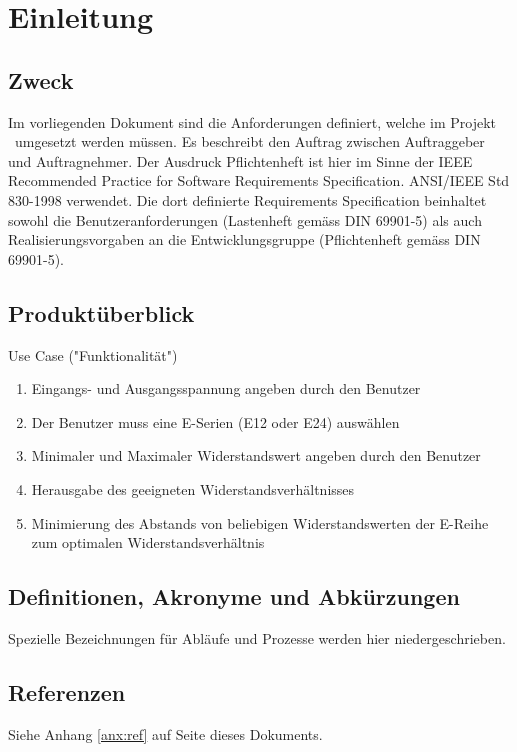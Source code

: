 \section{Einleitung}
\label{sec:intro}

\subsection{Zweck}
Im vorliegenden Dokument sind die Anforderungen definiert, welche im Projekt \subjectinfo\ umgesetzt werden müssen. 
Es beschreibt den Auftrag zwischen Auftraggeber und Auftragnehmer. 
Der Ausdruck Pflichtenheft ist hier im Sinne der IEEE Recommended Practice for Software Requirements Specification. ANSI/IEEE Std 830-1998 verwendet.
Die dort definierte Requirements Specification beinhaltet sowohl die Benutzeranforderungen (Lastenheft gemäss DIN 69901-5) als auch Realisierungsvorgaben an die Entwicklungsgruppe (Pflichtenheft gemäss DIN 69901-5).

\subsection{Produktüberblick}


Use Case ("Funktionalität") \\

\begin{enumerate}
	\item Eingangs- und Ausgangsspannung angeben durch den Benutzer
	\item Der Benutzer muss eine E-Serien (E12 oder E24) auswählen
	\item Minimaler und Maximaler Widerstandswert angeben durch den Benutzer
	\item Herausgabe des geeigneten Widerstandsverhältnisses
	\item Minimierung des Abstands von beliebigen Widerstandswerten der E-Reihe zum optimalen Widerstandsverhältnis
\end{enumerate}

\subsection{Definitionen, Akronyme und Abkürzungen}

Spezielle Bezeichnungen für Abläufe und Prozesse werden hier niedergeschrieben. 

\subsection{Referenzen}
Siehe Anhang \ref{anx:ref} auf Seite \pageref{anx:ref} dieses Dokuments.